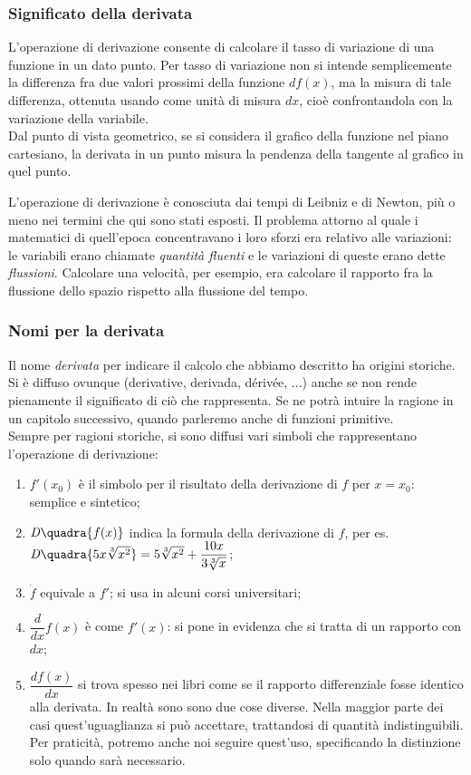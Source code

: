 \subsubsection{Significato della derivata}
L'operazione di derivazione consente di calcolare il tasso di variazione di una
funzione in un dato punto. Per tasso di variazione non si intende semplicemente
la differenza fra due valori prossimi della funzione $df(x)$, ma la misura di 
tale differenza, ottenuta usando come unità di misura $dx$, cioè confrontandola
con la variazione della variabile.\\
Dal punto di vista geometrico, se si considera il grafico della funzione 
nel piano cartesiano, la derivata in un punto misura la pendenza della tangente
al grafico in quel punto.

\begin{osservazione}
 L'operazione di derivazione è conosciuta dai tempi di Leibniz e di Newton, 
 più o meno nei termini che qui sono stati esposti. Il problema attorno al 
 quale i matematici di quell'epoca concentravano i loro sforzi era
 relativo alle variazioni: le variabili erano chiamate 
 \emph{quantità fluenti}  e le variazioni di queste erano dette 
 \emph{flussioni}.
 Calcolare una velocità, per esempio, era calcolare il rapporto
 fra la flussione dello spazio rispetto alla flussione del tempo.
\end{osservazione}

\subsubsection{Nomi per la derivata}
Il nome \emph{derivata} per indicare il calcolo che abbiamo descritto ha 
origini storiche. Si è diffuso  ovunque (derivative, derivada, dérivée, 
...) anche se non rende pienamente il significato di ciò che rappresenta. 
Se ne potrà intuire la ragione in un capitolo successivo, quando parleremo 
anche di funzioni primitive.\\
Sempre per ragioni storiche, si sono diffusi vari simboli che rappresentano 
l'operazione di derivazione:
\begin{enumerate}[noitemsep]
 \item $f'(x_0)$ è il simbolo per il risultato della derivazione di $f$ 
 per $x= x_0$: semplice e sintetico;
 \item $\mathit{D}\quadra{f(x)}$ indica la formula della derivazione di 
$f$,  per es. $\mathit{D}\quadra{5x\sqrt[3]{x^2}}=5\sqrt[3]{x^2}+\dfrac{10x}
 {3\sqrt[3]{x}}$;
 \item $\dot{f}$ equivale a $f'$; si usa in alcuni corsi universitari;
 \item $\dfrac{d}{dx}f(x)$ è come $f'(x)$: si pone in evidenza che si 
tratta di un rapporto con $dx$;
 \item $\dfrac{df(x)}{dx}$ si trova spesso nei libri come se il rapporto
 differenziale fosse identico alla derivata. In realtà sono sono due cose
 diverse.   Nella maggior parte dei casi quest'uguaglianza si può accettare, 
trattandosi di quantità indistinguibili. Per praticità, potremo
 anche noi seguire quest'uso, specificando la distinzione solo quando sarà 
 necessario.
\end{enumerate}


